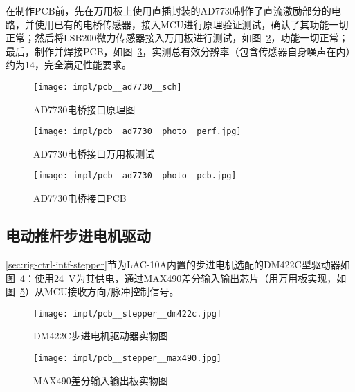 在制作PCB前，先在万用板上使用直插封装的AD7730制作了直流激励部分的电路，并使用已有的电桥传感器，接入MCU进行原理验证测试，确认了其功能一切正常；然后将LSB200微力传感器接入万用板进行测试，如图~\ref{fig:impl-pcb-ad7730-photo-perf}，功能一切正常；最后，制作并焊接PCB，如图~\ref{fig:impl-pcb-ad7730-photo-pcb}，实测总有效分辨率（包含传感器自身噪声在内）约为\SI{14}{\bit}，完全满足性能要求。

\begin{figure}[tbhp]
\centering
\texttt{[image: impl/pcb\_\_ad7730\_\_sch]}
\caption{AD7730电桥接口\csep 原理图}
\label{fig:impl-pcb-ad7730-sch}
\end{figure}

\begin{figure}[tbhp]
\centering
\texttt{[image: impl/pcb\_\_ad7730\_\_photo\_\_perf.jpg]}
\caption{AD7730电桥接口\csep 万用板测试}
\label{fig:impl-pcb-ad7730-photo-perf}
\end{figure}

\begin{figure}[tbhp]
\centering
\texttt{[image: impl/pcb\_\_ad7730\_\_photo\_\_pcb.jpg]}
\caption{AD7730电桥接口\csep PCB}
\label{fig:impl-pcb-ad7730-photo-pcb}
\end{figure}


\clearpage



\subsection{电动推杆步进电机驱动}\label{sec:impl-pcb-stepper}

\ref{sec:rig-ctrl-intf-stepper}节为LAC-10A内置的步进电机选配的DM422C型驱动器如图~\ref{fig:impl-pcb-stepper-dm422c}：使用\SI{+24}{\V}为其供电，通过MAX490差分输入输出芯片（用万用板实现，如图~\ref{fig:impl-pcb-stepper-max490}）从MCU接收方向/脉冲控制信号。

\begin{figure}[tbhp]
\centering
\texttt{[image: impl/pcb\_\_stepper\_\_dm422c.jpg]}
\caption{DM422C步进电机驱动器\csep 实物图}
\label{fig:impl-pcb-stepper-dm422c}
\end{figure}

\begin{figure}[tbhp]
\centering
\texttt{[image: impl/pcb\_\_stepper\_\_max490.jpg]}
\caption{MAX490差分输入输出板\csep 实物图}
\label{fig:impl-pcb-stepper-max490}
\end{figure}


